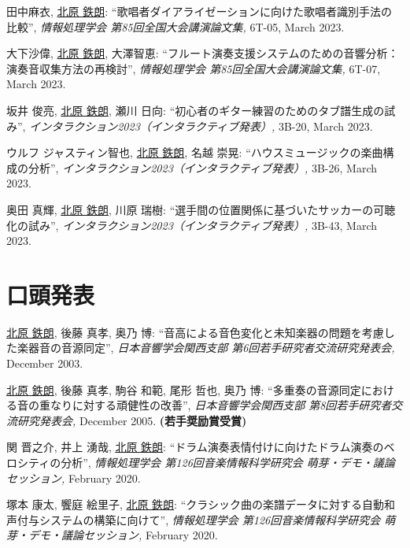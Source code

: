 \begin{Enumerate}
\item 
田中麻衣, 
\underline{北原 鉄朗}: 
    ``歌唱者ダイアライゼーションに向けた歌唱者識別手法の比較'', 
    {\it 情報処理学会 第85回全国大会講演論文集,
    } 6T-05, March 2023. 

\item 
大下沙偉, 
\underline{北原 鉄朗}, 
大澤智恵: 
    ``フルート演奏支援システムのための音響分析：演奏音収集方法の再検討'', 
    {\it 情報処理学会 第85回全国大会講演論文集,
    } 6T-07, March 2023. 

\item 
坂井 俊亮, 
\underline{北原 鉄朗}, 
瀬川 日向: 
    ``初心者のギター練習のためのタブ譜生成の試み'', 
    {\it インタラクション2023（インタラクティブ発表）,
    } 3B-20, March 2023. 

\item 
ウルフ ジャスティン智也, 
\underline{北原 鉄朗}, 
名越 崇晃: 
    ``ハウスミュージックの楽曲構成の分析'', 
    {\it インタラクション2023（インタラクティブ発表）,
    } 3B-26, March 2023. 

\item 
奥田 真輝, 
\underline{北原 鉄朗}, 
川原 瑞樹: 
    ``選手間の位置関係に基づいたサッカーの可聴化の試み'', 
    {\it インタラクション2023（インタラクティブ発表）,
    } 3B-43, March 2023. 

\end{Enumerate}

\section*{口頭発表}
\begin{Enumerate}
  
\item 
\underline{北原 鉄朗}, 
後藤
      真孝, 
奥乃 博: 
    ``音高による音色変化と未知楽器の問題を考慮した楽器音の音源同定'', 
    {\it 日本音響学会関西支部 第6回若手研究者交流研究発表会,
    } December 2003. 

\item 
\underline{北原 鉄朗}, 
後藤
      真孝, 
駒谷
      和範, 
尾形 哲也, 
奥乃 博: 
    ``多重奏の音源同定における音の重なりに対する頑健性の改善'', 
    {\it 日本音響学会関西支部 第8回若手研究者交流研究発表会,
    } December 2005. 
{\bf (若手奨励賞受賞)}
\item 
関 晋之介, 
井上 湧哉, 
\underline{北原 鉄朗}: 
    ``ドラム演奏表情付けに向けたドラム演奏のベロシティの分析'', 
    {\it 情報処理学会 第126回音楽情報科学研究会 萌芽・デモ・議論セッション,
    } February 2020. 

\item 
塚本 康太, 
饗庭 絵里子, 
\underline{北原 鉄朗}: 
    ``クラシック曲の楽譜データに対する自動和声付与システムの構築に向けて'', 
    {\it 情報処理学会 第126回音楽情報科学研究会 萌芽・デモ・議論セッション,
    } February 2020. 

\end{Enumerate}

